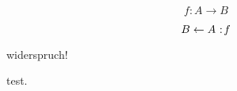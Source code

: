 \documentclass{article}
\begin{document}
\[
f \colon  A \to  B
\]

\[
    B \leftarrow A \noloc f
\] 

\contra

\Warning widerspruch!

 test.
\end{document}
